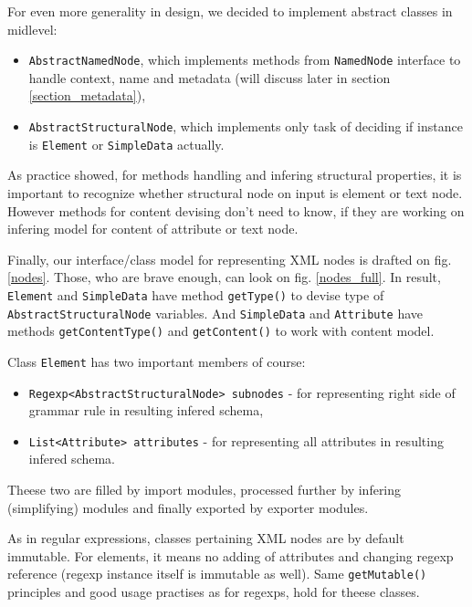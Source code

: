 \documentclass[a4paper,10pt,oneside]{article}
\newcommand{\code}[1]{\texttt{#1}}
\begin{document}
For even more generality in design, we decided to implement abstract classes in midlevel:
\begin{itemize}
	\item \code{AbstractNamedNode}, which implements methods from \code{NamedNode} interface to handle context, name and metadata (will discuss later in section \ref{section_metadata}),
	\item \code{AbstractStructuralNode}, which implements only task of deciding if instance is \code{Element} or \code{SimpleData} actually.
\end{itemize}
As practice showed, for methods handling and infering structural properties, it is important to recognize whether structural node on input is element or text node.
However methods for content devising don't need to know, if they are working on infering model for content of attribute or text node.

Finally, our interface/class model for representing XML nodes is drafted on fig. \ref{nodes}. Those, who are brave enough, can look on fig. \ref{nodes_full}.
In result, \code{Element} and \code{SimpleData} have method \code{getType()} to devise type of \code{AbstractStructuralNode} variables. And \code{SimpleData} and \code{Attribute} have methods \code{getContentType()} and \code{getContent()} to work with content model.

Class \code{Element} has two important members of course:
\begin{itemize}
	\item \code{Regexp<AbstractStructuralNode> subnodes} - for representing right side of grammar rule in resulting infered schema,
	\item \code{List<Attribute> attributes} - for representing all attributes in resulting infered schema.
\end{itemize}
Theese two are filled by import modules, processed further by infering (simplifying) modules and finally exported by exporter modules.

As in regular expressions, classes pertaining XML nodes are by default immutable.
For elements, it means no adding of attributes and changing regexp reference (regexp instance itself is immutable as well).
Same \code{getMutable()} principles and good usage practises as for regexps, hold for theese classes.
\end{document}
